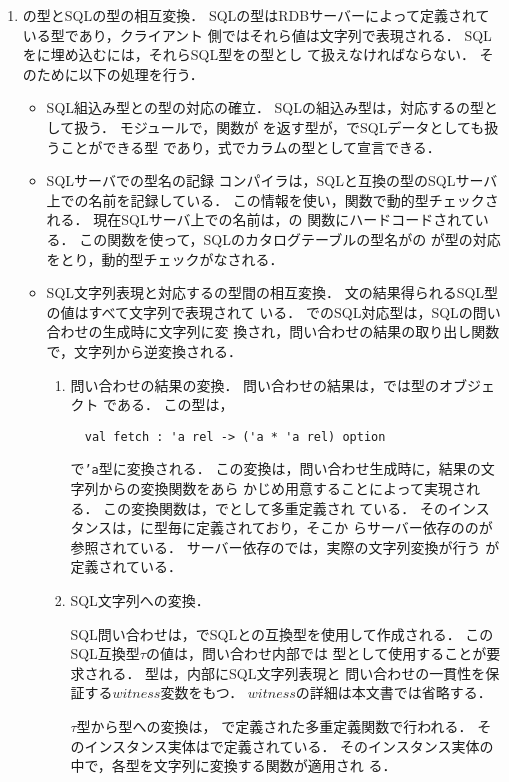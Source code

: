 \begin{enumerate}
\item \smlsharp{}の型とSQLの型の相互変換．
	SQLの型はRDBサーバーによって定義されている型であり，クライアント
側ではそれら値は文字列で表現される．
	SQLを\smlsharp{}に埋め込むには，それらSQL型を\smlsharp{}の型とし
て扱えなければならない．
	そのために以下の処理を行う．
\begin{itemize}
\item SQL組込み型と\smlsharp{}の型の対応の確立．
	SQLの組込み型は，対応する\smlsharp{}の型として扱う．
	モジュールで，関数が
を返す型が，\smlsharp{}でSQLデータとしても扱うことができる型
であり，式でカラムの型として宣言できる．
\item SQLサーバでの型名の記録
	コンパイラは，SQLと互換の型のSQLサーバ上での名前を記録している．
	この情報を使い，関数で動的型チェックされる．
	現在SQLサーバ上での名前は，の
関数にハードコードされている．
	この関数を使って，SQLのカタログテーブルの型名がの
が型の対応をとり，動的型チェックがなされる．

\item SQL文字列表現と対応する\smlsharp{}の型間の相互変換．
	文の結果得られるSQL型の値はすべて文字列で表現されて
いる．
	\smlsharp{}でのSQL対応型は，SQLの問い合わせの生成時に文字列に変
換され，問い合わせの結果の取り出し関数で，文字列から逆変換される．
\begin{enumerate}
\item 問い合わせの結果の変換．
	問い合わせの結果は，\smlsharp{}では型のオブジェクト
である．
	この型は，
\begin{verbatim}
  val fetch : 'a rel -> ('a * 'a rel) option
\end{verbatim}
で{\tt 'a}型に変換される．
	この変換は，問い合わせ生成時に，結果の文字列からの変換関数をあら
かじめ用意することによって実現される．
	この変換関数は，でとして多重定義され
ている．
	そのインスタンスは，に型毎に定義されており，そこか
らサーバー依存ののが参照されている．
	サーバー依存のでは，実際の文字列変換が行う
が定義されている．

\item SQL文字列への変換．

	SQL問い合わせは，\smlsharp{}でSQLとの互換型を使用して作成される．
	このSQL互換型$\tau$の値は，問い合わせ内部では
型として使用することが要求される．
	型は，内部にSQL文字列表現と
問い合わせの一貫性を保証する$witness$変数をもつ．
	$witness$の詳細は本文書では省略する．

	$\tau$型から型への変換は，
で定義された多重定義関数で行われる．
	そのインスタンス実体はで定義されている．
	そのインスタンス実体の中で，各型を文字列に変換する関数が適用され
る．

\end{enumerate}
\end{itemize}
\end{enumerate}

